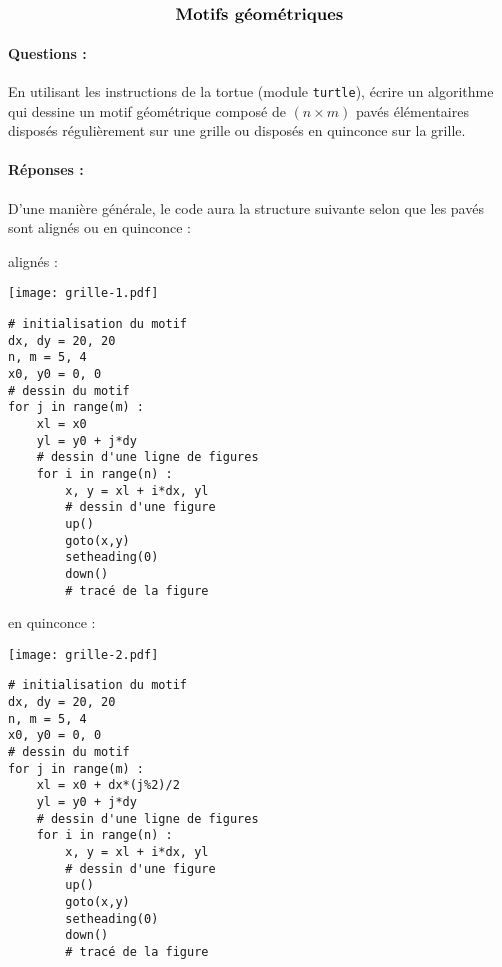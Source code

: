 \documentclass[11pt,a4paper]{article}
\begin{document}
$$\mbox{\textbf{\large Motifs géométriques}}$$


\paragraph{Questions :} 
En utilisant les instructions de la tortue \logo{}
(module \texttt{turtle}), écrire un algorithme qui dessine un motif géométrique
composé de $(n\times m)$ pavés élémentaires disposés régulièrement sur une grille
ou disposés en quinconce sur la grille.
\vspace*{3mm}

\paragraph{Réponses :} 
D'une manière générale, le code aura la structure suivante selon que les pavés sont alignés ou en quinconce :

\noindent
\mbox{}\hfill
\begin{minipage}[t]{6cm}
alignés :\\
\centerline{\texttt{[image: grille-1.pdf]}}

\footnotesize
\begin{Verbatim}[frame=single]
# initialisation du motif
dx, dy = 20, 20
n, m = 5, 4
x0, y0 = 0, 0
# dessin du motif
for j in range(m) :
    xl = x0
    yl = y0 + j*dy
    # dessin d'une ligne de figures
    for i in range(n) :
        x, y = xl + i*dx, yl
        # dessin d'une figure
        up()
        goto(x,y)
        setheading(0)
        down()
        # tracé de la figure
\end{Verbatim}
\end{minipage}
\hfill
\begin{minipage}[t]{6cm}
en quinconce :\\
\centerline{\texttt{[image: grille-2.pdf]}}

\footnotesize
\begin{Verbatim}[frame=single]
# initialisation du motif
dx, dy = 20, 20
n, m = 5, 4
x0, y0 = 0, 0
# dessin du motif
for j in range(m) :
    xl = x0 + dx*(j%2)/2
    yl = y0 + j*dy
    # dessin d'une ligne de figures
    for i in range(n) :
        x, y = xl + i*dx, yl
        # dessin d'une figure
        up()
        goto(x,y)
        setheading(0)
        down()
        # tracé de la figure
\end{Verbatim}
\end{minipage}
\hfill
\end{document}
